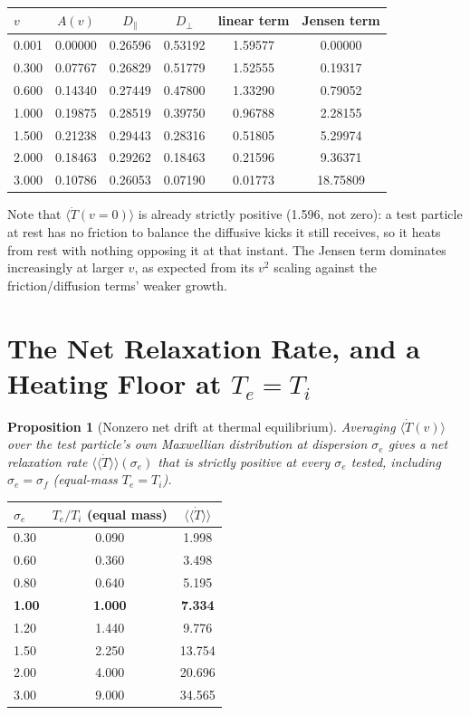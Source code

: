 \documentclass[12pt]{amsart}
\theoremstyle{plain}
\newtheorem{proposition}[theorem]{Proposition}
\theoremstyle{remark}
\begin{document}
\begin{center}
\small
\begin{tabular}{@{}lccccc@{}}
\toprule
$v$ & $A(v)$ & $D_\parallel$ & $D_\perp$ & linear term & Jensen term \\
\midrule
0.001 & 0.00000 & 0.26596 & 0.53192 & 1.59577 & 0.00000 \\
0.300 & 0.07767 & 0.26829 & 0.51779 & 1.52555 & 0.19317 \\
0.600 & 0.14340 & 0.27449 & 0.47800 & 1.33290 & 0.79052 \\
1.000 & 0.19875 & 0.28519 & 0.39750 & 0.96788 & 2.28155 \\
1.500 & 0.21238 & 0.29443 & 0.28316 & 0.51805 & 5.29974 \\
2.000 & 0.18463 & 0.29262 & 0.18463 & 0.21596 & 9.36371 \\
3.000 & 0.10786 & 0.26053 & 0.07190 & 0.01773 & 18.75809 \\
\bottomrule
\end{tabular}
\end{center}

Note that $\langle\dot T(v{=}0)\rangle$ is already strictly positive (1.596, not zero): a test particle at rest has no friction to balance the diffusive kicks it still receives, so it heats from rest with nothing opposing it at that instant. The Jensen term dominates increasingly at larger $v$, as expected from its $v^2$ scaling against the friction/diffusion terms' weaker growth.

\section{The Net Relaxation Rate, and a Heating Floor at $T_e=T_i$}

\begin{proposition}[Nonzero net drift at thermal equilibrium]\label{prop:floor}
Averaging $\langle\dot T(v)\rangle$ over the test particle's own Maxwellian distribution at dispersion $\sigma_e$ gives a net relaxation rate $\langle\langle\dot T\rangle\rangle(\sigma_e)$ that is strictly positive at every $\sigma_e$ tested, including $\sigma_e=\sigma_f$ (equal-mass $T_e=T_i$).
\end{proposition}

\begin{center}
\small
\begin{tabular}{@{}lcc@{}}
\toprule
$\sigma_e$ & $T_e/T_i$ (equal mass) & $\langle\langle\dot T\rangle\rangle$ \\
\midrule
0.30 & 0.090 & 1.998 \\
0.60 & 0.360 & 3.498 \\
0.80 & 0.640 & 5.195 \\
\textbf{1.00} & \textbf{1.000} & \textbf{7.334} \\
1.20 & 1.440 & 9.776 \\
1.50 & 2.250 & 13.754 \\
2.00 & 4.000 & 20.696 \\
3.00 & 9.000 & 34.565 \\
\bottomrule
\end{tabular}
\end{center}
\end{document}
